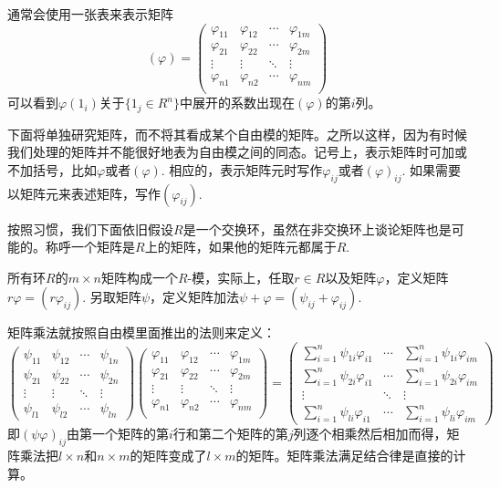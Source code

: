 \para 通常会使用一张表来表示矩阵
\[
(\varphi)=
\begin{pmatrix}
	\varphi_{11} & \varphi_{12} & \cdots & \varphi_{1m}\\
	\varphi_{21} & \varphi_{22} & \cdots & \varphi_{2m}\\
	\vdots & \vdots & \ddots & \vdots \\
	\varphi_{n1} & \varphi_{n2} & \cdots & \varphi_{nm}\\
\end{pmatrix}
\]
可以看到$\varphi(1_i)$关于$\{1_j\in R^n\}$中展开的系数出现在$(\varphi)$的第$i$列。

下面将单独研究矩阵，而不将其看成某个自由模的矩阵。之所以这样，因为有时候我们处理的矩阵并不能很好地表为自由模之间的同态。记号上，表示矩阵时可加或不加括号，比如$\varphi$或者$(\varphi)$. 相应的，表示矩阵元时写作$\varphi_{ij}$或者$(\varphi)_{ij}$. 如果需要以矩阵元来表述矩阵，写作$(\varphi_{ij})$. 

按照习惯，我们下面依旧假设$R$是一个交换环，虽然在非交换环上谈论矩阵也是可能的。称呼一个矩阵是$R$上的矩阵，如果他的矩阵元都属于$R$.

所有环$R$的$m\times n$矩阵构成一个$R$-模，实际上，任取$r\in R$以及矩阵$\varphi$，定义矩阵$r\varphi= (r\varphi_{ij})$. 另取矩阵$\psi$，定义矩阵加法$\psi+\varphi=(\psi_{ij}+\varphi_{ij})$.

矩阵乘法就按照自由模里面推出的法则来定义：
\begin{equation}
\begin{pmatrix}
	\psi_{11} & \psi_{12} & \cdots & \psi_{1n}\\
	\psi_{21} & \psi_{22} & \cdots & \psi_{2n}\\
	\vdots & \vdots & \ddots & \vdots \\
	\psi_{l1} & \psi_{l2} & \cdots & \psi_{ln}
\end{pmatrix}
\begin{pmatrix}
	\varphi_{11} & \varphi_{12} & \cdots & \varphi_{1m}\\
	\varphi_{21} & \varphi_{22} & \cdots & \varphi_{2m}\\
	\vdots & \vdots & \ddots & \vdots \\
	\varphi_{n1} & \varphi_{n2} & \cdots & \varphi_{nm}\\
\end{pmatrix}
=
\begin{pmatrix}
	\sum_{i=1}^n \psi_{1i}\varphi_{i1} & \cdots & \sum_{i=1}^n \psi_{1i}\varphi_{im}\\
	\sum_{i=1}^n \psi_{2i}\varphi_{i1} & \cdots & \sum_{i=1}^n \psi_{2i}\varphi_{im}\\
	\vdots & \ddots & \vdots \\
	\sum_{i=1}^n \psi_{li}\varphi_{i1} & \cdots & \sum_{i=1}^n \psi_{li}\varphi_{im}
\end{pmatrix}
\end{equation}
即$(\psi\varphi)_{ij}$由第一个矩阵的第$i$行和第二个矩阵的第$j$列逐个相乘然后相加而得，矩阵乘法把$l\times n$和$n \times m$的矩阵变成了$l \times m$的矩阵。矩阵乘法满足结合律是直接的计算。

